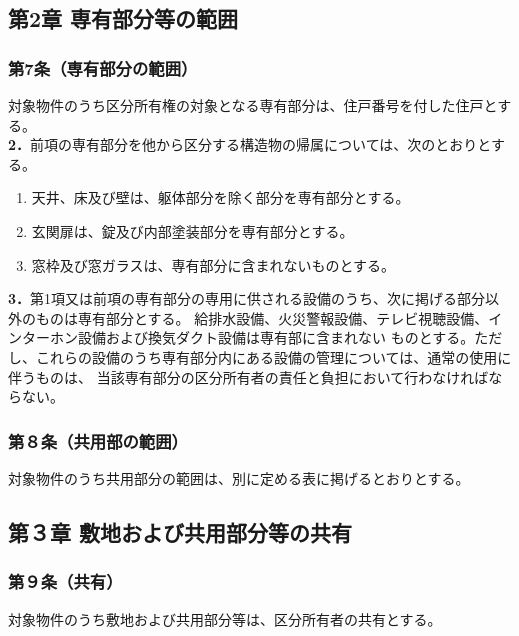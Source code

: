 \documentclass[
  luatex,
  paper=a4paper,
  fontsize=11pt,
  jafontsize=10pt,
  jlreq_notes,
]{jlreq}
\begin{document}
  \begin{center}
  \subsection*{第2章 専有部分等の範囲}
  \end{center}
  \subsubsection*{ 第7条（専有部分の範囲）}
  対象物件のうち区分所有権の対象となる専有部分は、住戸番号を付した住戸とする。\\
  \textbf{2．}前項の専有部分を他から区分する構造物の帰属については、次のとおりとする。
  \begin{enumerate}
  \item 天井、床及び壁は、躯体部分を除く部分を専有部分とする。
  \item 玄関扉は、錠及び内部塗装部分を専有部分とする。
  \item 窓枠及び窓ガラスは、専有部分に含まれないものとする。 
  \end{enumerate}
  \textbf{3．}第1項又は前項の専有部分の専用に供される設備のうち、次に掲げる部分以外のものは専有部分とする。
  給排水設備、火災警報設備、テレビ視聴設備、インターホン設備および換気ダクト設備は専有部に含まれない
  ものとする。ただし、これらの設備のうち専有部分内にある設備の管理については、通常の使用に伴うものは、
  当該専有部分の区分所有者の責任と負担において行わなければならない。
  \subsubsection*{第８条（共用部の範囲）}
  対象物件のうち共用部分の範囲は、別に定める表に掲げるとおりとする。
  
  \begin{center}
  \subsection*{第３章 敷地および共用部分等の共有}
  \end{center}
  \subsubsection*{第９条（共有）}
  対象物件のうち敷地および共用部分等は、区分所有者の共有とする。
\end{document}
